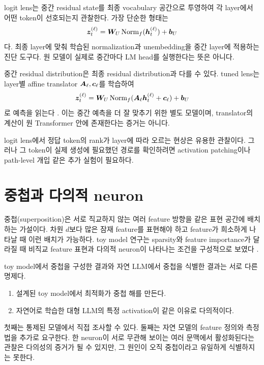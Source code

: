 logit lens는 중간 residual state를 최종 vocabulary 공간으로 투영하여 각 layer에서 어떤 token이 선호되는지 관찰한다.
가장 단순한 형태는
\begin{equation}
  \bm{z}^{(\ell)}_t=
  \bm{W}_U\operatorname{Norm}_f(\bm{h}^{(\ell)}_t)+\bm{b}_U
  \label{eq:logit-lens}
\end{equation}
다.
최종 layer에 맞춰 학습된 normalization과 unembedding을 중간 layer에 적용하는 진단 도구다.
원 모델이 실제로 중간마다 LM head를 실행한다는 뜻은 아니다.

중간 residual distribution은 최종 residual distribution과 다를 수 있다.
tuned lens는 layer별 affine translator $\bm{A}_{\ell},\bm{c}_{\ell}$를 학습하여
\begin{equation}
  \bm{z}^{(\ell)}_t=
  \bm{W}_U\operatorname{Norm}_f
  (\bm{A}_{\ell}\bm{h}^{(\ell)}_t+\bm{c}_{\ell})+\bm{b}_U
\end{equation}
로 예측을 읽는다 \citep{belrose2023tunedlens}.
이는 중간 예측을 더 잘 맞추기 위한 별도 모델이며, translator의 계산이 원 Transformer 안에 존재한다는 증거는 아니다.

logit lens에서 정답 token의 rank가 layer에 따라 오르는 현상은 유용한 관찰이다.
그러나 그 token이 실제 생성에 필요했던 경로를 확인하려면 activation patching이나 path-level 개입 같은 추가 실험이 필요하다.

\section{중첩과 다의적 neuron}

중첩(superposition)은 서로 직교하지 않는 여러 feature 방향을 같은 표현 공간에 배치하는 가설이다.
차원 $d$보다 많은 잠재 feature를 표현해야 하고 feature가 희소하게 나타날 때 이런 배치가 가능하다.
toy model 연구는 sparsity와 feature importance가 달라질 때 비직교 feature 표현과 다의적 neuron이 나타나는 조건을 구성적으로 보였다 \citep{elhage2022superposition}.

toy model에서 중첩을 구성한 결과와 자연 LLM에서 중첩을 식별한 결과는 서로 다른 명제다.

\begin{enumerate}
  \item 설계된 toy model에서 최적화가 중첩 해를 만든다.
  \item 자연어로 학습한 대형 LLM의 특정 activation이 같은 이유로 다의적이다.
\end{enumerate}

첫째는 통제된 모델에서 직접 조사할 수 있다.
둘째는 자연 모델의 feature 정의와 측정법을 추가로 요구한다.
한 neuron이 서로 무관해 보이는 여러 문맥에서 활성화된다는 관찰은 다의성의 증거가 될 수 있지만, 그 원인이 오직 중첩이라고 유일하게 식별하지는 못한다.

